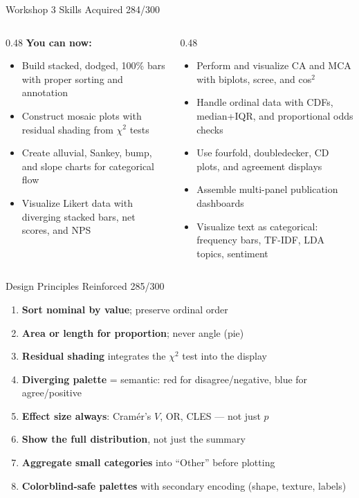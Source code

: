 \documentclass[10pt]{beamer}
\newcommand{\smark}[1]{\hfill{\scriptsize\color{codegray}#1}}
\begin{document}
\begin{frame}{Workshop 3 Skills Acquired}
\smark{284/300}
\begin{columns}[T]
\begin{column}{0.48\textwidth}
    \textbf{You can now:}
    \begin{itemize}
        \item Build stacked, dodged, 100\% bars with proper sorting and annotation
        \item Construct mosaic plots with residual shading from $\chi^2$ tests
        \item Create alluvial, Sankey, bump, and slope charts for categorical flow
        \item Visualize Likert data with diverging stacked bars, net scores, and NPS
    \end{itemize}
\end{column}
\begin{column}{0.48\textwidth}
    \begin{itemize}
        \item Perform and visualize CA and MCA with biplots, scree, and cos$^2$
        \item Handle ordinal data with CDFs, median+IQR, and proportional odds checks
        \item Use fourfold, doubledecker, CD plots, and agreement displays
        \item Assemble multi-panel publication dashboards
        \item Visualize text as categorical: frequency bars, TF-IDF, LDA topics, sentiment
    \end{itemize}
\end{column}
\end{columns}
\end{frame}

\begin{frame}{Design Principles Reinforced}
\smark{285/300}
\begin{enumerate}
    \item \textbf{Sort nominal by value}; preserve ordinal order
    \item \textbf{Area or length for proportion}; never angle (pie)
    \item \textbf{Residual shading} integrates the $\chi^2$ test into the display
    \item \textbf{Diverging palette} = semantic: red for disagree/negative, blue for agree/positive
    \item \textbf{Effect size always}: Cram\'er's $V$, OR, CLES --- not just $p$
    \item \textbf{Show the full distribution}, not just the summary
    \item \textbf{Aggregate small categories} into ``Other'' before plotting
    \item \textbf{Colorblind-safe palettes} with secondary encoding (shape, texture, labels)
\end{enumerate}
\end{frame}
\end{document}
